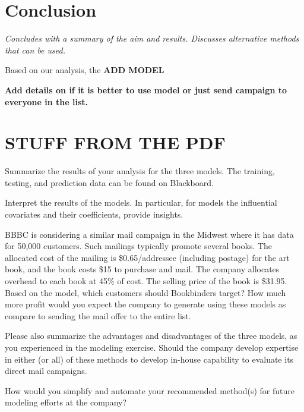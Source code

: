 \documentclass[
]{article}
\begin{document}
\hypertarget{conclusion}{%
\section{Conclusion}\label{conclusion}}

\emph{Concludes with a summary of the aim and results. Discusses
alternative methods that can be used.}

Based on our analysis, the \textbf{ADD MODEL}

\textbf{Add details on if it is better to use model or just send
campaign to everyone in the list.}

\hypertarget{stuff-from-the-pdf}{%
\section{STUFF FROM THE PDF}\label{stuff-from-the-pdf}}

Summarize the results of your analysis for the three models. The
training, testing, and prediction data can be found on Blackboard.

Interpret the results of the models. In particular, for models the
influential covariates and their coefficients, provide insights.

BBBC is considering a similar mail campaign in the Midwest where it has
data for 50,000 customers. Such mailings typically promote several
books. The allocated cost of the mailing is \$0.65/addressee (including
postage) for the art book, and the book costs \$15 to purchase and mail.
The company allocates overhead to each book at 45\% of cost. The selling
price of the book is \$31.95. Based on the model, which customers should
Bookbinders target? How much more profit would you expect the company to
generate using these models as compare to sending the mail offer to the
entire list.

Please also summarize the advantages and disadvantages of the three
models, as you experienced in the modeling exercise. Should the company
develop expertise in either (or all) of these methods to develop
in-house capability to evaluate its direct mail campaigns.

How would you simplify and automate your recommended method(s) for
future modeling efforts at the company?
\end{document}
